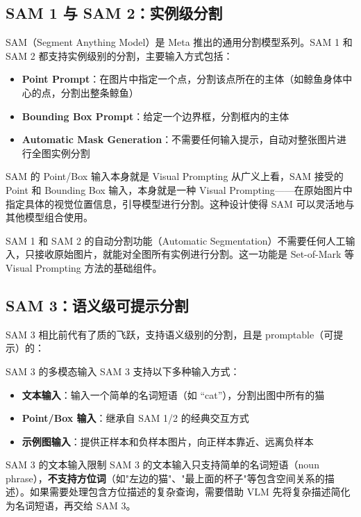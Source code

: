 \documentclass[a4paper]{article}
\begin{document}
\subsection{SAM 1 与 SAM 2：实例级分割}

SAM（Segment Anything Model）是 Meta 推出的通用分割模型系列。SAM 1 和 SAM 2 都支持实例级别的分割，主要输入方式包括：

\begin{itemize}
    \item \textbf{Point Prompt}：在图片中指定一个点，分割该点所在的主体（如鲸鱼身体中心的点，分割出整条鲸鱼）
    \item \textbf{Bounding Box Prompt}：给定一个边界框，分割框内的主体
    \item \textbf{Automatic Mask Generation}：不需要任何输入提示，自动对整张图片进行全图实例分割
\end{itemize}

\begin{knowledgebox}{SAM 的 Point/Box 输入本身就是 Visual Prompting}
从广义上看，SAM 接受的 Point 和 Bounding Box 输入，本身就是一种 Visual Prompting——在原始图片中指定具体的视觉位置信息，引导模型进行分割。这种设计使得 SAM 可以灵活地与其他模型组合使用。
\end{knowledgebox}

SAM 1 和 SAM 2 的自动分割功能（Automatic Segmentation）不需要任何人工输入，只接收原始图片，就能对全图所有实例进行分割。这一功能是 Set-of-Mark 等 Visual Prompting 方法的基础组件。

\subsection{SAM 3：语义级可提示分割}

SAM 3 相比前代有了质的飞跃，支持语义级别的分割，且是 promptable（可提示）的：

\begin{importantbox}{SAM 3 的多模态输入}
SAM 3 支持以下多种输入方式：
\begin{itemize}
    \item \textbf{文本输入}：输入一个简单的名词短语（如 ``cat''），分割出图中所有的猫
    \item \textbf{Point/Box 输入}：继承自 SAM 1/2 的经典交互方式
    \item \textbf{示例图输入}：提供正样本和负样本图片，向正样本靠近、远离负样本
\end{itemize}
\end{importantbox}

\begin{warningbox}{SAM 3 的文本输入限制}
SAM 3 的文本输入只支持简单的名词短语（noun phrase），\textbf{不支持方位词}（如"左边的猫"、"最上面的杯子"等包含空间关系的描述）。如果需要处理包含方位描述的复杂查询，需要借助 VLM 先将复杂描述简化为名词短语，再交给 SAM 3。
\end{warningbox}
\end{document}
